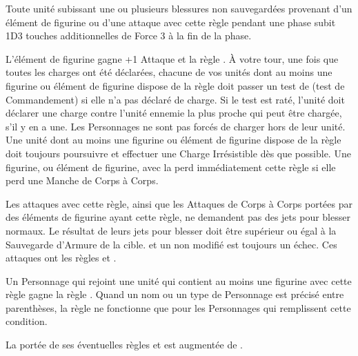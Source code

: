 
Toute unité subissant une ou plusieurs blessures non sauvegardées provenant d'un élément de figurine ou d'une attaque avec cette règle pendant une phase subit 1D3 touches additionnelles de Force 3 à la fin de la phase.


L'élément de figurine gagne +1 Attaque et la règle \immunetopsychology{}. À votre tour, une fois que toutes les charges ont été déclarées, chacune de vos unités dont au moins une figurine ou élément de figurine dispose de la règle \frenzy{} doit passer un test de \frenzy{} (test de Commandement) si elle n'a pas déclaré de charge. Si le test est raté, l'unité doit déclarer une charge contre l'unité ennemie la plus proche qui peut être chargée, s'il y en a une. Les Personnages ne sont pas forcés de charger hors de leur unité. Une unité dont au moins une figurine ou élément de figurine dispose de la règle \frenzy{} doit toujours poursuivre et effectuer une Charge Irrésistible dès que possible. Une figurine, ou élément de figurine, avec la \frenzy{} perd immédiatement cette règle si elle perd une Manche de Corps à Corps.


Les attaques avec cette règle, ainsi que les Attaques de Corps à Corps portées par des éléments de figurine ayant cette règle, ne demandent pas des jets pour blesser normaux. Le résultat de leurs jets pour blesser doit être supérieur ou égal à la Sauvegarde d'Armure de la cible.  et un  non modifié est toujours un échec. Ces attaques ont les règles \flamingattacks{} et .


Un Personnage qui rejoint une unité qui contient au moins une figurine avec cette règle gagne la règle \stubborn{}. Quand un nom ou un type de Personnage est précisé entre parenthèses, la règle ne fonctionne que pour les Personnages qui remplissent cette condition.


 La portée de ses éventuelles règles \inspiringpresence{} et \holdyourground{} est augmentée de .

